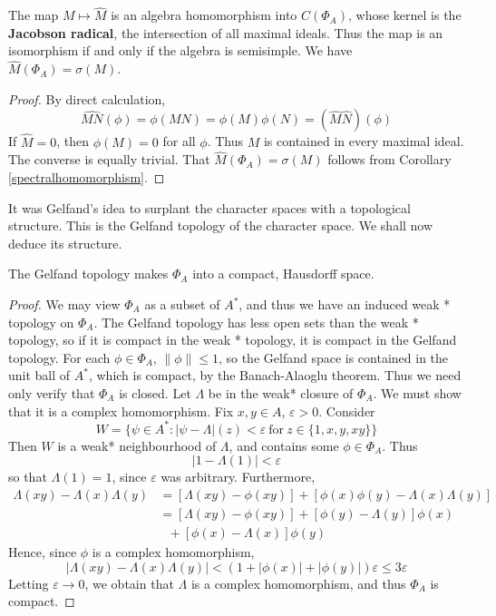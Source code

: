 \begin{lemma}
    The map $M \mapsto \widehat{M}$ is an algebra homomorphism into $C(\Phi_A)$, whose kernel is the {\bf Jacobson radical}, the intersection of all maximal ideals. Thus the map is an isomorphism if and only if the algebra is semisimple. We have $\widehat{M}(\Phi_A) = \sigma(M)$.
\end{lemma}
\begin{proof}
    By direct calculation,
    \[ \widehat{MN}(\phi) = \phi(MN) = \phi(M) \phi(N) = (\widehat{M} \widehat{N})(\phi) \]
    If $\widehat{M} = 0$, then $\phi(M) = 0$ for all $\phi$. Thus $M$ is contained in every maximal ideal. The converse is equally trivial. That $\widehat{M}(\Phi_A) = \sigma(M)$ follows from Corollary \ref{spectralhomomorphism}.
\end{proof}

It was Gelfand's idea to surplant the character spaces with a topological structure. This is the Gelfand topology of the character space. We shall now deduce its structure.

\begin{theorem}
    The Gelfand topology makes $\Phi_A$ into a compact, Hausdorff space.
\end{theorem}
\begin{proof}
    We may view $\Phi_A$ as a subset of $A^*$, and thus we have an induced weak * topology on $\Phi_A$. The Gelfand topology has less open sets than the weak * topology, so if it is compact in the weak * topology, it is compact in the Gelfand topology. For each $\phi \in \Phi_A$, $\| \phi \| \leq 1$, so the Gelfand space is contained in the unit ball of $A^*$, which is compact, by the Banach-Alaoglu theorem. Thus we need only verify that $\Phi_A$ is closed. Let $\Lambda$ be in the weak* closure of $\Phi_A$. We must show that it is a complex homomorphism. Fix $x,y \in A$, $\varepsilon > 0$. Consider
    \[ W = \{ \psi \in A^* : | \psi - \Lambda | (z) < \varepsilon\ \text{for}\ z \in \{ 1, x, y, xy \} \} \]
    Then $W$ is a weak* neighbourhood of $\Lambda$, and contains some $\phi \in \Phi_A$. Thus
    \[ | 1 - \Lambda(1) | < \varepsilon \]
    so that $\Lambda(1) = 1$, since $\varepsilon$ was arbitrary. Furthermore,
    \begin{align*}
        \Lambda(xy) -   \Lambda(x) \Lambda(y) &= [\Lambda(xy) - \phi(xy)] + [\phi(x)\phi(y) - \Lambda(x)\Lambda(y)]\\
        &= [\Lambda(xy) - \phi(xy)] + [\phi(y) - \Lambda(y)] \phi(x)\\
        &\ \ \ + [\phi(x) - \Lambda(x)] \phi(y)
    \end{align*}
    Hence, since $\phi$ is a complex homomorphism,
    \[ | \Lambda(xy) -   \Lambda(x) \Lambda(y) | < (1 + |\phi(x)| + |\phi(y)|) \varepsilon \leq 3 \varepsilon \]
    Letting $\varepsilon \to 0$, we obtain that $\Lambda$ is a complex homomorphism, and thus $\Phi_A$ is compact.
\end{proof}

